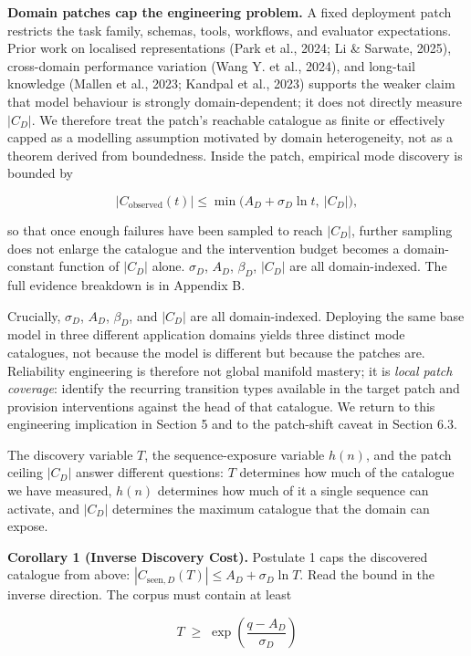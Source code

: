 \documentclass[
]{article}
\begin{document}
\textbf{Domain patches cap the engineering problem.} A fixed deployment
patch restricts the task family, schemas, tools, workflows, and
evaluator expectations. Prior work on localised representations (Park et
al., 2024; Li \& Sarwate, 2025), cross-domain performance variation
(Wang Y. et al., 2024), and long-tail knowledge (Mallen et al., 2023;
Kandpal et al., 2023) supports the weaker claim that model behaviour is
strongly domain-dependent; it does not directly measure \(|C_D|\). We
therefore treat the patch's reachable catalogue as finite or effectively
capped as a modelling assumption motivated by domain heterogeneity, not
as a theorem derived from boundedness. Inside the patch, empirical mode
discovery is bounded by

\[
|C_{\text{observed}}(t)| \leq \min\bigl(A_D + \sigma_D \ln t,\ |C_D|\bigr),
\]

so that once enough failures have been sampled to reach \(|C_D|\),
further sampling does not enlarge the catalogue and the intervention
budget becomes a domain-constant function of \(|C_D|\) alone.
\(\sigma_D\), \(A_D\), \(\beta_D\), \(|C_D|\) are all domain-indexed.
The full evidence breakdown is in Appendix B.

Crucially, \(\sigma_D\), \(A_D\), \(\beta_D\), and \(|C_D|\) are all
domain-indexed. Deploying the same base model in three different
application domains yields three distinct mode catalogues, not because
the model is different but because the patches are. Reliability
engineering is therefore not global manifold mastery; it is \emph{local
patch coverage}: identify the recurring transition types available in
the target patch and provision interventions against the head of that
catalogue. We return to this engineering implication in Section 5 and to
the patch-shift caveat in Section 6.3.

The discovery variable \(T\), the sequence-exposure variable \(h(n)\),
and the patch ceiling \(|C_D|\) answer different questions: \(T\)
determines how much of the catalogue we have measured, \(h(n)\)
determines how much of it a single sequence can activate, and \(|C_D|\)
determines the maximum catalogue that the domain can expose.

\textbf{Corollary 1 (Inverse Discovery Cost).} Postulate 1 caps the
discovered catalogue from above:
\(|C_{\text{seen},D}(T)| \le A_D + \sigma_D \ln T\). Read the bound in
the inverse direction. The corpus must contain at least

\[
T \;\geq\; \exp\!\left(\frac{q - A_D}{\sigma_D}\right)
\]
\end{document}
